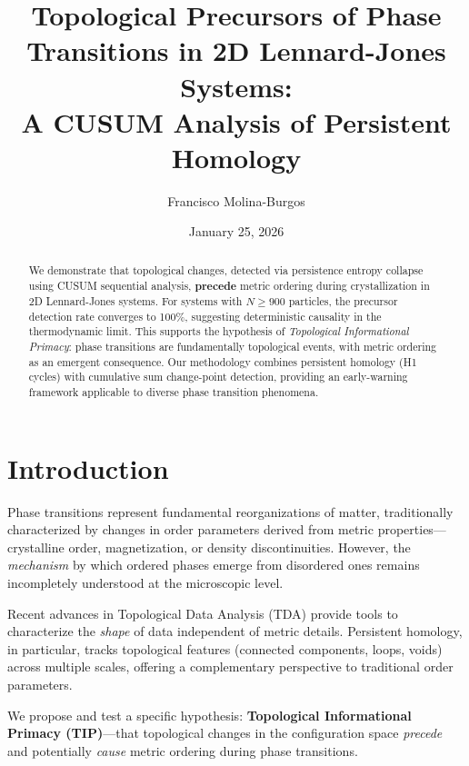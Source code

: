\documentclass[aps,pre,twocolumn,superscriptaddress]{revtex4-2}
\begin{document}
\title{Topological Precursors of Phase Transitions in 2D Lennard-Jones Systems:\\
A CUSUM Analysis of Persistent Homology}

\author{Francisco Molina-Burgos}

\date{January 25, 2026}

\begin{abstract}
We demonstrate that topological changes, detected via persistence entropy collapse using CUSUM sequential analysis, \textbf{precede} metric ordering during crystallization in 2D Lennard-Jones systems. For systems with $N \geq 900$ particles, the precursor detection rate converges to 100\%, suggesting deterministic causality in the thermodynamic limit. This supports the hypothesis of \textit{Topological Informational Primacy}: phase transitions are fundamentally topological events, with metric ordering as an emergent consequence. Our methodology combines persistent homology (H1 cycles) with cumulative sum change-point detection, providing an early-warning framework applicable to diverse phase transition phenomena.
\end{abstract}

\maketitle

\section{Introduction}

Phase transitions represent fundamental reorganizations of matter, traditionally characterized by changes in order parameters derived from metric properties---crystalline order, magnetization, or density discontinuities. However, the \textit{mechanism} by which ordered phases emerge from disordered ones remains incompletely understood at the microscopic level.

Recent advances in Topological Data Analysis (TDA) provide tools to characterize the \textit{shape} of data independent of metric details. Persistent homology, in particular, tracks topological features (connected components, loops, voids) across multiple scales, offering a complementary perspective to traditional order parameters.

We propose and test a specific hypothesis: \textbf{Topological Informational Primacy (TIP)}---that topological changes in the configuration space \textit{precede} and potentially \textit{cause} metric ordering during phase transitions.
\end{document}
